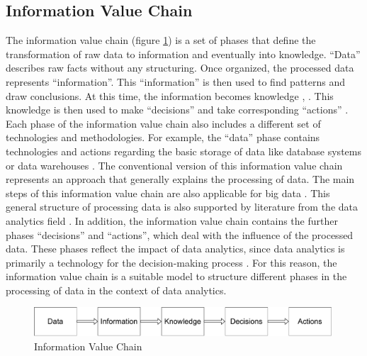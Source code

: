 \subsection{Information Value Chain}

The information value chain (figure \ref{information_value_chain}) is a set of phases that define the transformation of raw data to information and eventually into knowledge. \enquote{Data} describes raw facts without any structuring. Once organized, the processed data represents \enquote{information}. This \enquote{information} is then used to find patterns and draw conclusions. At this time, the information becomes knowledge \parencite{Fayyad.1996}, \cite{Fayyad.1996b}. This knowledge is then used to make \enquote{decisions} and take corresponding \enquote{actions} \parencite{Sharma.2014}. Each phase of the information value chain also includes a different set of technologies and methodologies. For example, the \enquote{data} phase contains technologies and actions regarding the basic storage of data like database systems or data warehouses \parencite{Abbasi.2016}. The conventional version of this information value chain represents an approach that generally explains the processing of data. The main steps of this information value chain are also applicable for big data \parencite{Abbasi.2016}. This general structure of processing data is also supported by literature from the data analytics field \parencite{Runkler.2020}. In addition, the information value chain contains the further phases \enquote{decisions} and \enquote{actions}, which deal with the influence of the processed data. These phases reflect the impact of data analytics, since data analytics is primarily a technology for the decision-making process \parencite{Runkler.2020}. For this reason, the information value chain is a suitable model to structure different phases in the processing of data in the context of data analytics. %



\begin{figure}[]
    \includegraphics[width=0.99\textwidth, keepaspectratio]{content/02_theretical_foundations/informationValueChain.pdf}
    \caption{Information Value Chain}    
    \label{information_value_chain}
\end{figure}

